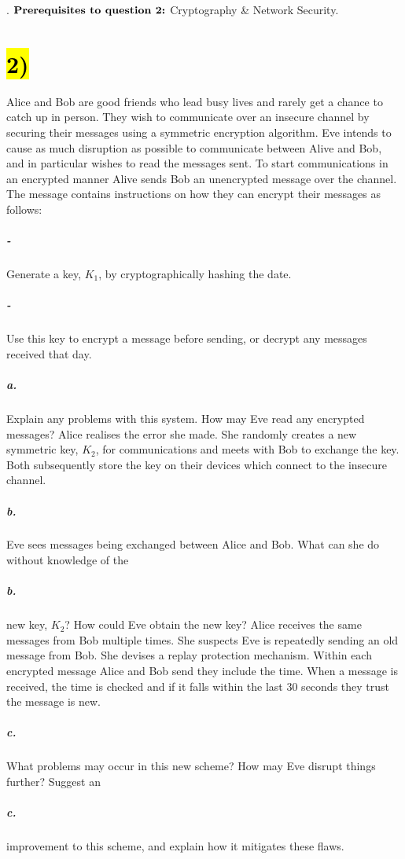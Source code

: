 \documentclass[11pt]{article}
\newcommand{\pnewline}[1]{\vspace*{-\baselineskip}\subparagraph*{{\color{white} #1}}}
\newcommand{\skipnewline}{\vspace*{-\baselineskip}}
\begin{document}
{%

{\color{white}.}\newline
$\text{\bf {Prerequisites to question 2:}}$ Cryptography \& Network Security.
\section*{\hl{2)}} Alice and Bob are good friends who lead busy lives and rarely get a chance to catch up in person. They wish to communicate over an insecure channel by securing their messages using a symmetric encryption algorithm. Eve intends to cause as much disruption as possible to communicate between Alive and Bob, and in particular wishes to read the messages sent. \newline\newline
To start communications in an encrypted manner Alive sends Bob an unencrypted message over the channel. The message contains instructions on how they can encrypt their messages as follows:
\subparagraph*{-} Generate a key, $K_1$, by cryptographically hashing the date. \skipnewline
\subparagraph*{-} Use this key to encrypt a message before sending, or decrypt any messages received that day.
\subparagraph*{a.} Explain any problems with this system. How may Eve read any encrypted messages?\newline\newline
Alice realises the error she made. She randomly creates a new symmetric key, $K_2$, for communications and meets with Bob to exchange the key. Both subsequently store the key on their devices which connect to the insecure channel. 
\subparagraph*{b.} Eve sees messages being exchanged between Alice and Bob. What can she do without knowledge of the \skipnewline\pnewline{b.}new key, $K_2$? How could Eve obtain the new key?\newline\newline
Alice receives the same messages from Bob multiple times. She suspects Eve is repeatedly sending an old message from Bob. She devises a replay protection mechanism. Within each encrypted message Alice and Bob send they include the time. When a message is received, the time is checked and if it falls within the last 30 seconds they trust the message is new.
\subparagraph*{c.} What problems may occur in this new scheme? How may Eve disrupt things further? Suggest an \pnewline{c.} improvement to this scheme, and explain how it mitigates these flaws. \newline\newline
}
\end{document}
